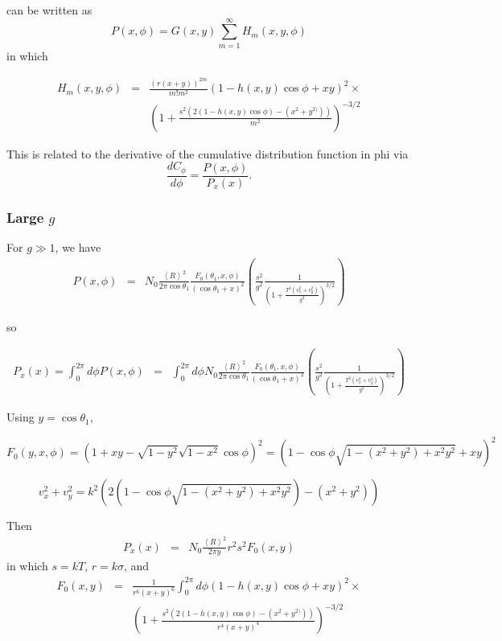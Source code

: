\documentclass[11pt]{article}
\newcommand{\der}[2]{\frac{d {#1}}{d {#2}}}
\begin{document}
{{{{can be written as
$$P(x,\phi)=G(x,y)\sum_{m=1}^{\infty}H_{m}(x,y,\phi)$$
in which


\begin{eqnarray} H_{m}(x,y,\phi)&=&\frac{(r(x+y))^{2m}}{m!m^{2}}\left(1-h(x,y)\cos\phi +xy\right)^{2}\times\\
&&\left(1+\frac{s^{2}\left(2(1-h(x,y)\cos\phi )-(x^{2}+y^{2)})\right)}{m^{2}}\right)^{-3/2}
\end{eqnarray}

This is related to the derivative of the cumulative distribution function in phi via
$$\der{C_{\phi}}{\phi}=\frac{P(x,\phi)}{P_{x}(x)}.$$

\subsubsection{Large $g$}

For $g\gg 1$, we have
\begin{eqnarray}
P(x,\phi)&=&N_{0}\frac{\left<R\right>^{2}}{2\pi\cos\theta_{1}}\frac{F_{0}(\theta_{1},x,\phi)}{(\cos{\theta_{1}}+x)^{2}}
\left(\frac{s^{2}}{g^{2}}\frac{1}{\left(1+\frac{T^{2}(v_{x}^{2}+v_{y}^{2})}{g^{2}}\right)^{3/2}}\right)\end{eqnarray}

so

\begin{eqnarray}
P_{x}(x)=\int_{0}^{2\pi}d\phi P(x,\phi)&=&
\int_{0}^{2\pi}d\phi N_{0}\frac{\left<R\right>^{2}}{2\pi\cos\theta_{1}}\frac{F_{0}(\theta_{1},x,\phi)}{(\cos{\theta_{1}}+x)^{2}}
\left(\frac{s^{2}}{g^{2}}\frac{1}{\left(1+\frac{T^{2}(v_{x}^{2}+v_{y}^{2})}{g^{2}}\right)^{3/2}}\right)\end{eqnarray}

Using $y=\cos\theta_{1},$

$$F_{0}(y,x,\phi)=\left(1+xy-\sqrt{1-y^{2}}\sqrt{1-x^{2}}\cos\phi\right)^{2}=\left(1-\cos\phi\sqrt{1-(x^{2}+y^{2})+x^{2}y^{2}}+xy\right)^{2}$$


$$v_{x}^{2}+v_{y}^{2}=k^{2}\left(2\left(1-\cos\phi\sqrt{1-(x^{2}+y^{2})+x^{2}y^{2}}\right)-(x^{2}+y^{2})\right)$$

Then
\begin{eqnarray}
P_{x}(x)&=&N_{0}\frac{\left<R\right>^{2}}{2\pi y}
r^{2}s^{2}
F_{0}(x,y)
\end{eqnarray}
in which $s=kT$, $r=k\sigma$, and 
\begin{eqnarray} F_{0}(x,y)&=&\frac{1}{r^{6}(x+y)^{6}}\int_{0}^{2\pi}d\phi\left(1-h(x,y)\cos\phi +xy\right)^{2}\times\\
&&\left(1+\frac{s^{2}\left(2(1-h(x,y)\cos\phi) -(x^{2}+y^{2)})\right)}{r^{4}(x+y)^{4}}\right)^{-3/2}
\end{eqnarray}

}}}}
\end{document}
